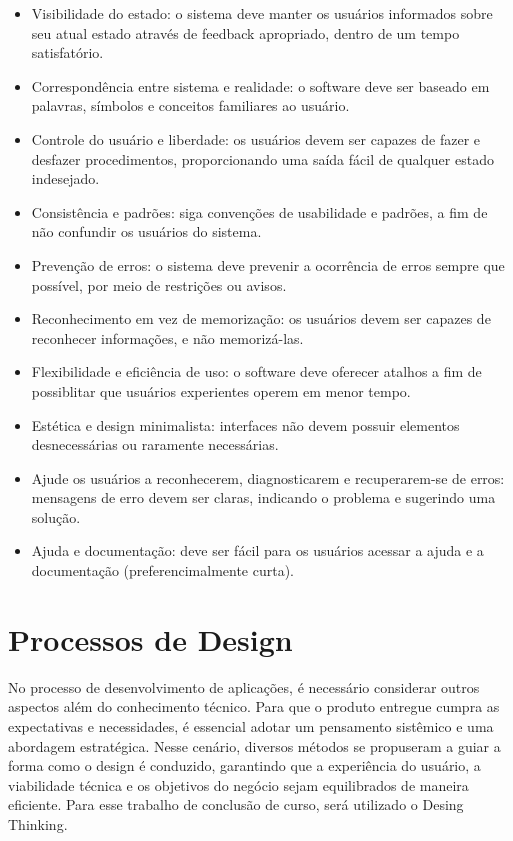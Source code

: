 \begin{itemize}
    \item Visibilidade do estado: o sistema deve manter os usuários informados sobre seu atual estado através de feedback apropriado, dentro de um tempo satisfatório.
    \item Correspondência entre sistema e realidade: o software deve ser baseado em palavras, símbolos e conceitos familiares ao usuário.
    \item Controle do usuário e liberdade: os usuários devem ser capazes de fazer e desfazer procedimentos, proporcionando uma saída fácil de qualquer estado indesejado.
    \item Consistência e padrões: siga convenções de usabilidade e padrões, a fim de não confundir os usuários do sistema.
    \item Prevenção de erros: o sistema deve prevenir a ocorrência de erros sempre que possível, por meio de restrições ou avisos.
    \item Reconhecimento em vez de memorização: os usuários devem ser capazes de reconhecer informações, e não memorizá-las.
    \item Flexibilidade e eficiência de uso: o software deve oferecer atalhos  a fim de possiblitar que usuários experientes operem em menor tempo.
    \item Estética e design minimalista: interfaces não devem possuir elementos desnecessárias ou raramente necessárias.
    \item Ajude os usuários a reconhecerem, diagnosticarem e recuperarem-se de erros: mensagens de erro devem ser claras, indicando o problema e sugerindo uma solução.
    \item Ajuda e documentação: deve ser fácil para os usuários acessar a ajuda e a documentação (preferencimalmente curta).
\end{itemize}

\section{Processos de Design}
No processo de desenvolvimento de aplicações, é necessário considerar outros aspectos além do conhecimento técnico. Para que o produto entregue cumpra as expectativas e necessidades, é essencial adotar um pensamento sistêmico e uma abordagem estratégica. Nesse cenário, diversos métodos se propuseram a guiar a forma como o design é conduzido, garantindo que a experiência do usuário, a viabilidade técnica e os objetivos do negócio sejam equilibrados de maneira eficiente. Para esse trabalho de conclusão de curso, será utilizado o Desing Thinking.

